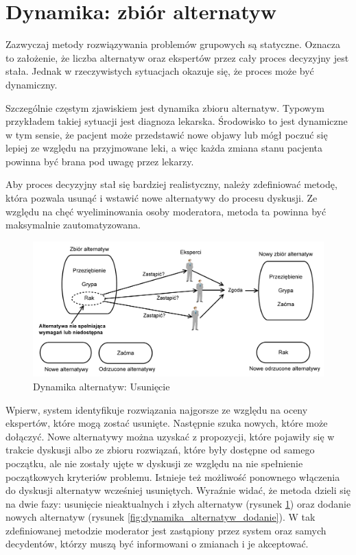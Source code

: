 \section{Dynamika: zbiór alternatyw}
Zazwyczaj metody rozwiązywania problemów grupowych są statyczne. Oznacza to 
założenie, że liczba alternatyw oraz ekspertów przez cały proces decyzyjny jest 
stała. Jednak w rzeczywistych sytuacjach okazuje się, że proces może być 
dynamiczny.

Szczególnie częstym zjawiskiem jest dynamika zbioru alternatyw. Typowym 
przykładem takiej sytuacji jest diagnoza lekarska. Środowisko to jest dynamiczne
w tym sensie, że pacjent może przedstawić nowe objawy lub mógł poczuć się lepiej
ze względu na przyjmowane leki, a więc każda zmiana stanu pacjenta powinna być 
brana pod uwagę przez lekarzy.

Aby proces decyzyjny stał się bardziej realistyczny, należy zdefiniować metodę, 
która pozwala usunąć i wstawić nowe alternatywy do procesu dyskusji. Ze względu 
na chęć wyeliminowania osoby moderatora, metoda ta powinna być maksymalnie 
zautomatyzowana.

\begin{figure}[ht]
  \includegraphics[width=\linewidth]
  	{chapters/modelinggroupdecision/usuniecie_alternatyw-eps-converted-to.pdf}
  \caption{Dynamika alternatyw: Usunięcie}
  \label{fig:dynamika_alternatyw_usuniecie}
\end{figure}

Wpierw, system identyfikuje rozwiązania najgorsze ze względu na oceny ekspertów,
które mogą zostać usunięte. Następnie szuka nowych, które może dołączyć. Nowe 
alternatywy można uzyskać z propozycji, które pojawiły się w trakcie dyskusji 
albo ze zbioru rozwiązań, które były dostępne od samego początku, ale nie 
zostały ujęte w dyskusji ze względu na nie spełnienie początkowych kryteriów 
problemu. Istnieje też możliwość ponownego włączenia do dyskusji alternatyw 
wcześniej usuniętych. Wyraźnie widać, że metoda dzieli się na dwie fazy: 
usunięcie nieaktualnych i złych alternatyw (rysunek
\ref{fig:dynamika_alternatyw_usuniecie}) oraz dodanie nowych alternatyw (rysunek
\ref{fig:dynamika_alternatyw_dodanie}).
W tak zdefiniowanej metodzie moderator jest zastąpiony przez system oraz samych decydentów, którzy muszą być informowani o 
zmianach i je akceptować.

